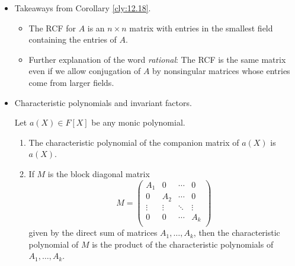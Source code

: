 \documentclass[../notes.tex]{subfiles}
\begin{document}
\begin{itemize}
\begin{corollary}
\begin{enumerate}
            \item The matrices $A,B$ are similar over $K$ iff they are similar over $F$, i.e., there exists an invertible $n\times n$ matrix $P$ with entries from $K$ such that $B=P^{-1}AP$ iff there exists an (in general different) invertible $n\times n$ matrix $Q$ with entries from $F$ such that $B=Q^{-1}AQ$.
        \end{enumerate}
        \begin{proof}
            Given.
        \end{proof}
    \end{corollary}
    \item Takeaways from Corollary \ref{cly:12.18}.
    \begin{itemize}
        \item The RCF for $A$ is an $n\times n$ matrix with entries in the smallest field containing the entries of $A$.
        \item Further explanation of the word \emph{rational}: The RCF is the same matrix even if we allow conjugation of $A$ by nonsingular matrices whose entries come from larger fields.
    \end{itemize}
    \item Characteristic polynomials and invariant factors.
    \begin{lemma}\label{lem:12.19}
        Let $a(X)\in F[X]$ be any monic polynomial.
        \begin{enumerate}
            \item The characteristic polynomial of the companion matrix of $a(X)$ is $a(X)$.
            \item If $M$ is the block diagonal matrix
            \begin{equation*}
                M =
                \begin{pmatrix}
                    A_1 & 0 & \cdots & 0\\
                    0 & A_2 & \cdots & 0\\
                    \vdots & \vdots & \ddots & \vdots\\
                    0 & 0 & \cdots & A_k\\
                \end{pmatrix}
            \end{equation*}
            given by the direct sum of matrices $A_1,\dots,A_k$, then the characteristic polynomial of $M$ is the product of the characteristic polynomials of $A_1,\dots,A_k$.
        \end{enumerate}

\end{lemma}
\end{itemize}
\end{document}
